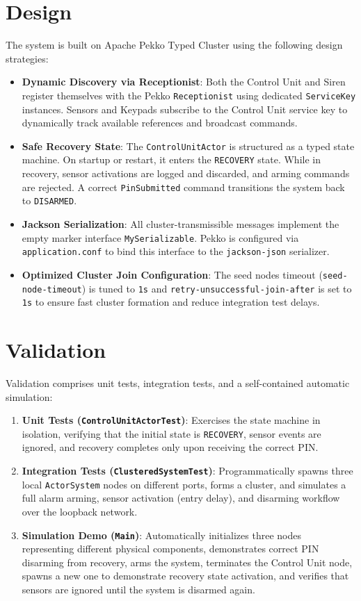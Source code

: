 \documentclass[11pt,a4paper]{article}
\begin{document}
\section{Design}
The system is built on Apache Pekko Typed Cluster using the following design strategies:
\begin{itemize}
    \item \textbf{Dynamic Discovery via Receptionist}: Both the Control Unit and Siren register themselves with the Pekko \texttt{Receptionist} using dedicated \texttt{ServiceKey} instances. Sensors and Keypads subscribe to the Control Unit service key to dynamically track available references and broadcast commands.
    \item \textbf{Safe Recovery State}: The \texttt{ControlUnitActor} is structured as a typed state machine. On startup or restart, it enters the \texttt{RECOVERY} state. While in recovery, sensor activations are logged and discarded, and arming commands are rejected. A correct \texttt{PinSubmitted} command transitions the system back to \texttt{DISARMED}.
    \item \textbf{Jackson Serialization}: All cluster-transmissible messages implement the empty marker interface \texttt{MySerializable}. Pekko is configured via \texttt{application.conf} to bind this interface to the \texttt{jackson-json} serializer.
    \item \textbf{Optimized Cluster Join Configuration}: The seed nodes timeout (\texttt{seed-node-timeout}) is tuned to \texttt{1s} and \texttt{retry-unsuccessful-join-after} is set to \texttt{1s} to ensure fast cluster formation and reduce integration test delays.
\end{itemize}

\section{Validation}
Validation comprises unit tests, integration tests, and a self-contained automatic simulation:
\begin{enumerate}
    \item \textbf{Unit Tests (\texttt{ControlUnitActorTest})}: Exercises the state machine in isolation, verifying that the initial state is \texttt{RECOVERY}, sensor events are ignored, and recovery completes only upon receiving the correct PIN.
    \item \textbf{Integration Tests (\texttt{ClusteredSystemTest})}: Programmatically spawns three local \texttt{ActorSystem} nodes on different ports, forms a cluster, and simulates a full alarm arming, sensor activation (entry delay), and disarming workflow over the loopback network.
    \item \textbf{Simulation Demo (\texttt{Main})}: Automatically initializes three nodes representing different physical components, demonstrates correct PIN disarming from recovery, arms the system, terminates the Control Unit node, spawns a new one to demonstrate recovery state activation, and verifies that sensors are ignored until the system is disarmed again.
\end{enumerate}
\end{document}

